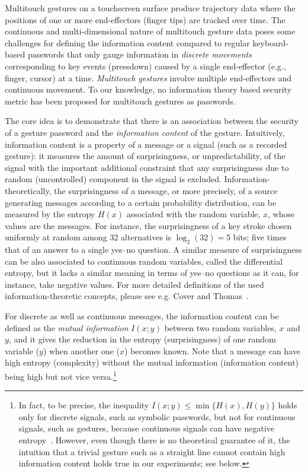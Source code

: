 \documentclass{sig-alternate-10pt}
\begin{document}
Multitouch gestures on a touchscreen surface produce trajectory data where the positions of one or more end-effectors (finger tips) are tracked over time.
The continuous and multi-dimensional nature of multitouch gesture data poses some challenges for defining the information content
compared to regular keyboard-based passwords that only gauge information in \emph{discrete movements} corresponding to key events (pressdown) caused by a single end-effector (e.g., finger, cursor) at a time.
\emph{Multitouch gestures} involve multiple end-effectors and continuous movement.
To our knowledge, no information theory based security metric has been proposed for multitouch gestures as passwords.



The core idea is to demonstrate that there is an association between the security of a gesture password and the \emph{information content} of the gesture. Intuitively, information content is a property of a
message or a signal (such as a recorded gesture): it measures
the amount of surprisingness, or unpredictability, of the signal
with the important additional constraint that any surprisingness
due to random (uncontrolled) component in the signal is
excluded. Information-theoretically, the surprisingness of a message, or more precisely, of a source generating messages according to a certain probability distribution, can be measured by the entropy $H(x)$ associated with the random variable, $x$, whose values are the messages. For instance, the surprisingness of a key stroke chosen uniformly at random among 32 alternatives is $\log_2(32) = 5$ 
bits; five times that of an answer to a single yes--no question.
A similar measure of surprisingness can be also associated to continuous random variables, called the differential entropy, but it lacks a similar meaning in terms of yes--no questions as it can, for instance, take negative values. For more detailed definitions of the used information-theoretic concepts, please see e.g. Cover and Thomas~\cite{cover-thomas}. 

For discrete as well as continuous messages, the information content can be defined as the \emph{mutual information} $I(x;y)$ between two random variables, $x$ and $y$, and it gives the reduction in the entropy (surprisingness) of one random variable ($y$) when another one ($x$) becomes known. Note that a message can have high entropy (complexity) without the mutual information (information content) being high but not vice versa.\footnote{In fact, to be precise, the inequality $I(x;y) \leq \min\{H(x),H(y)\}$ holds only for discrete signals, such as symbolic passwords, but not for continuous signals, such as gestures, because continuous signals can have negative entropy~\cite{cover-thomas}. However, even though there is no theoretical guarantee of it, the intuition that a trivial gesture such as a straight line cannot contain high information content holds true in our experiments; see below.} 
\end{document}
